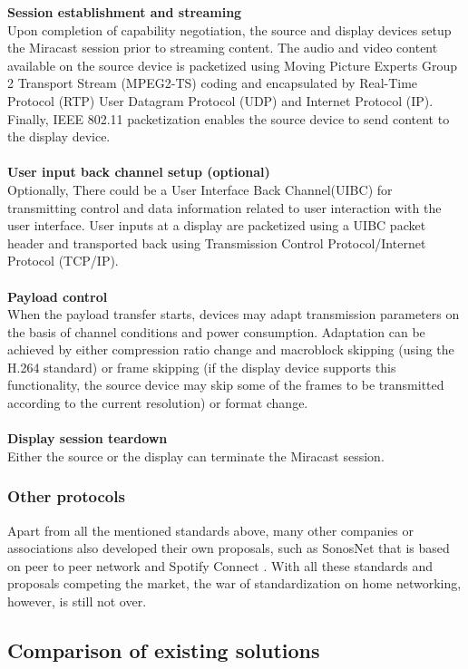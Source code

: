 \textbf{Session establishment and streaming} \\
Upon completion of capability negotiation, the source and display devices setup the Miracast session prior to streaming content. The audio and video content available on the source device is packetized 
using Moving Picture Experts Group 2 Transport Stream (MPEG2-TS) coding and encapsulated by Real-Time Protocol (RTP) User Datagram Protocol (UDP) and Internet Protocol (IP). Finally, IEEE 802.11 packetization enables the source device to send content to the display device. \\
\\
\textbf{User input back channel setup (optional)}\\
Optionally, There could be a User Interface Back Channel(UIBC) for transmitting control and data information related to user interaction with the user interface. User inputs at a display are packetized using a UIBC packet header and transported back using Transmission Control Protocol/Internet Protocol (TCP/IP).\\
\\
\textbf{Payload control}\\
When the payload transfer starts, devices may adapt transmission parameters on the basis of channel conditions and power     consumption. Adaptation can be achieved by either compression ratio change and macroblock skipping (using the H.264 standard) or frame skipping (if the display device supports this functionality, the source device may skip some of the frames to be transmitted according to the current resolution) or format change. \\
\\ 
\textbf{Display session teardown} \\
Either the source or the display can terminate the Miracast session.
\subsubsection{Other protocols}
Apart from all the mentioned standards above, many other companies or associations 
also developed their own proposals, such as SonosNet \cite{sonosnet} that is 
based on peer to peer network and Spotify Connect \cite{spotifyconnect}. With all these standards and proposals competing the market, the war of standardization on home networking, however, is still not over. 

\subsection{Comparison of existing solutions} 
